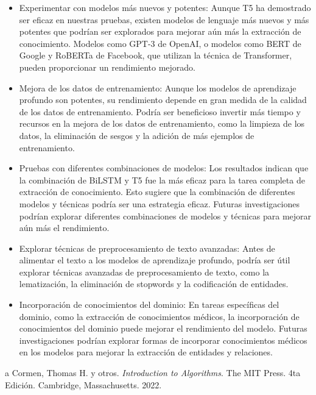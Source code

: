 \documentclass[10pt]{article} %
\begin{document}
	\begin{itemize}
		\item Experimentar con modelos más nuevos y potentes: Aunque T5 ha demostrado ser eficaz en nuestras pruebas, existen modelos de lenguaje más nuevos y más potentes que podrían ser explorados para mejorar aún más la extracción de conocimiento. Modelos como GPT-3 de OpenAI, o modelos como BERT de Google y RoBERTa de Facebook, que utilizan la técnica de Transformer, pueden proporcionar un rendimiento mejorado.
		\item Mejora de los datos de entrenamiento: Aunque los modelos de aprendizaje profundo son potentes, su rendimiento depende en gran medida de la calidad de los datos de entrenamiento. Podría ser beneficioso invertir más tiempo y recursos en la mejora de los datos de entrenamiento, como la limpieza de los datos, la eliminación de sesgos y la adición de más ejemplos de entrenamiento.
		\item Pruebas con diferentes combinaciones de modelos: Los resultados indican que la combinación de BiLSTM y T5 fue la más eficaz para la tarea completa de extracción de conocimiento. Esto sugiere que la combinación de diferentes modelos y técnicas podría ser una estrategia eficaz. Futuras investigaciones podrían explorar diferentes combinaciones de modelos y técnicas para mejorar aún más el rendimiento.
		\item Explorar técnicas de preprocesamiento de texto avanzadas: Antes de alimentar el texto a los modelos de aprendizaje profundo, podría ser útil explorar técnicas avanzadas de preprocesamiento de texto, como la lematización, la eliminación de stopwords y la codificación de entidades.
		\item Incorporación de conocimientos del dominio: En tareas específicas del dominio, como la extracción de conocimientos médicos, la incorporación de conocimientos del dominio puede mejorar el rendimiento del modelo. Futuras investigaciones podrían explorar formas de incorporar conocimientos médicos en los modelos para mejorar la extracción de entidades y relaciones.
	\end{itemize}
	
   	
	\begin{thebibliography}
		a
		 Cormen, Thomas H. y otros. \emph{Introduction to Algorithms}. 
		The MIT Press.
		4ta Edici\'on.		
		Cambridge, Massachusetts.
		2022.
	\end{thebibliography}
\end{document}
